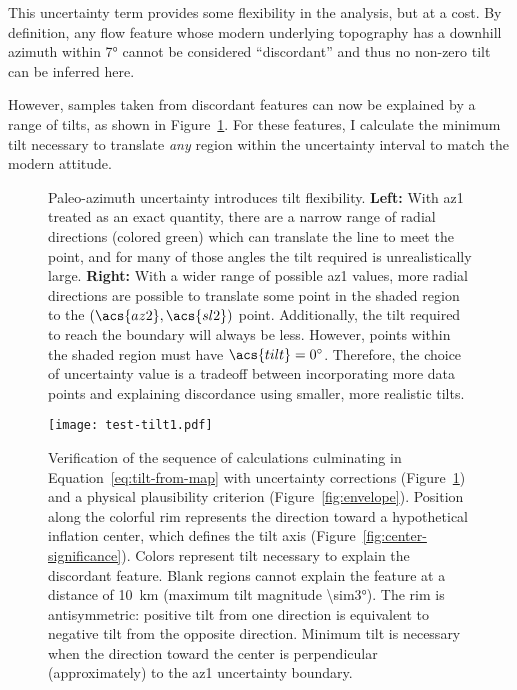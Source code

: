 This uncertainty term provides some flexibility in the analysis, but at a cost. By definition, any flow feature whose modern underlying topography has a downhill azimuth within \ang{7} cannot be considered ``discordant'' and thus no non-zero tilt can be inferred here.

However, samples taken from discordant features can now be explained by a range of tilts, as shown in Figure~\ref{fig:az1-uncertainty}. For these features, I calculate the minimum tilt necessary to translate \emph{any} region within the uncertainty interval to match the modern attitude.

\begin{figure}
    \caption[Paleo-azimuth uncertainty]{Paleo-azimuth uncertainty introduces tilt flexibility. \textbf{Left:} With \acs{az1} treated as an exact quantity, there are a narrow range of radial directions (colored green) which can translate the line to meet the point, and for many of those angles the tilt required is unrealistically large. \textbf{Right:} With a wider range of possible \acs{az1} values, more radial directions are possible to translate some point in the shaded region to the $(\acs{az2},\acs{sl2})$ point. Additionally, the tilt required to reach the boundary will always be less. However, points within the shaded region must have $\acs{tilt}=\ang{0}$. Therefore, the choice of uncertainty value is a tradeoff between incorporating more data points and explaining discordance using smaller, more realistic tilts.}%
    \label{fig:az1-uncertainty}
\end{figure}

\begin{figure}
    \texttt{[image: test-tilt1.pdf]}%
    \caption[Tilt equation verification]{Verification of the sequence of calculations culminating in Equation~\eqref{eq:tilt-from-map} with uncertainty corrections (Figure~\ref{fig:az1-uncertainty}) and a physical plausibility criterion (Figure~\ref{fig:envelope}). Position along the colorful rim represents the direction toward a hypothetical inflation center, which defines the tilt axis (Figure~\ref{fig:center-significance}). Colors represent tilt necessary to explain the discordant feature. Blank regions cannot explain the feature at a distance of \qty{10}{\km} (maximum tilt magnitude \ang{\sim3}). The rim is antisymmetric: positive tilt from one direction is equivalent to negative tilt from the opposite direction. Minimum tilt is necessary when the direction toward the center is perpendicular (approximately) to the \acs{az1} uncertainty boundary.}
    \label{fig:test-tilt}
\end{figure}

